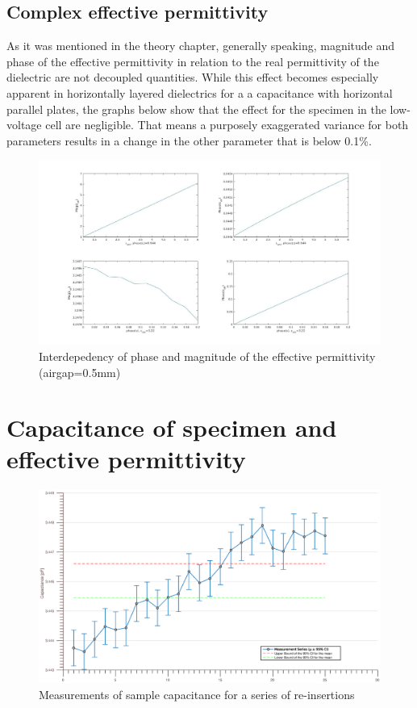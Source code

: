 \subsection{Complex effective permittivity}
As it was mentioned in the theory chapter, generally speaking, magnitude and phase of the effective permittivity in relation to the
real permittivity of the dielectric are not decoupled quantities. While this effect becomes especially apparent in horizontally layered dielectrics for a
a capacitance with horizontal parallel plates, the graphs below show that the effect for the specimen in the low-voltage cell are negligible. That means a purposely exaggerated variance for both parameters
results in a change in the other parameter that is below 0.1\%.

\begin{figure}[htbp]
	\centering
	\centerline{\includegraphics[scale=0.3]{figures/Results/Complex/complex_permittivity_specimen}}		
	\caption[Kurze Abbildungsbeschreibung]{Interdepedency of phase and magnitude of the effective permittivity (airgap=0.5mm) } 
	\label{fig.complex}
\end{figure}

\section{Capacitance of specimen and effective permittivity}
\begin{figure}[ht]
	\centering
	\includegraphics[scale=0.3]{figures/Results/Capacitance_Measure/capacitanceplot.eps}		
	\caption[Kurze Abbildungsbeschreibung]{Measurements of sample capacitance for a series of re-insertions} 
	\label{fig.messreihe}
\end{figure}

